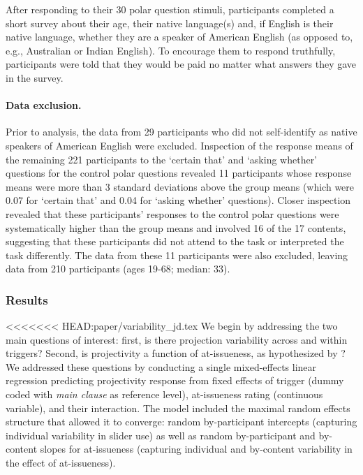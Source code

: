 \documentclass[11pt,fleqn]{article}
\newcommand{\6}{\mbox{$[\hspace*{-.6mm}[$}}
\newcommand{\9}{\mbox{$]\hspace*{-.6mm}]$}}
\begin{document}
After responding to their 30 polar question stimuli, participants completed a short survey about their age, their native language(s) and, if English is their native language, whether they are a speaker of American English (as opposed to, e.g., Australian or Indian English). To encourage them to respond truthfully, participants were told that they would be paid no matter what answers they gave in the survey.

\paragraph{Data exclusion.}
Prior to analysis, the data from 29 participants who did not self-identify as native speakers of American English were excluded. Inspection of the response means of the remaining 221 participants to the `certain that' and `asking whether' questions for the control polar questions revealed 11 participants whose response means were more than 3 standard deviations above the group means (which were 0.07 for `certain that' and 0.04 for `asking whether' questions). Closer inspection revealed that these participants' responses to the control polar questions were systematically higher than the group means and involved 16 of the 17 contents, suggesting that these participants did not attend to the task or interpreted the task differently. The data from these 11 participants were also excluded, leaving data from 210 participants (ages 19-68; median: 33).  


\subsubsection{Results}

<<<<<<< HEAD:paper/variability_jd.tex
We begin by addressing the two main questions of interest: first, is there projection variability across and within triggers? Second, is projectivity a function of at-issueness, as hypothesized by \citet{brst-salt10}? We addressed these questions by conducting a single mixed-effects linear regression predicting projectivity response from fixed effects of trigger (dummy coded with \emph{main clause} as reference level), at-issueness rating (continuous variable), and their interaction. The model included the maximal random effects structure that allowed it to converge: random by-participant intercepts (capturing individual variability in slider use) as well as random by-participant and by-content slopes for at-issueness (capturing individual and by-content variability in the effect of at-issueness).
\end{document}
